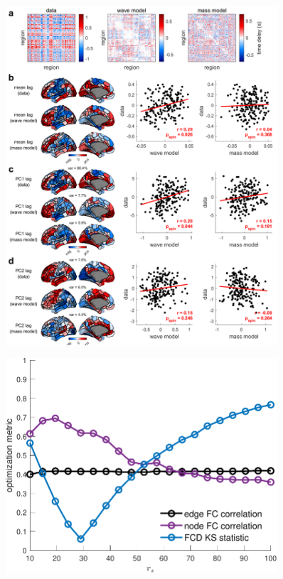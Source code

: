 \documentclass[sn-mathphys-num]{sn-jnl}%
\theoremstyle{thmstyleone}%
\theoremstyle{thmstyletwo}%
\theoremstyle{thmstylethree}%
\begin{document}
\begin{figure}[!htb] 
	\centering
	\includegraphics[width=0.9\textwidth]{fig/extended_fig_9.pdf}
	\caption{}
	\label{fig:extended_fig_9}
\end{figure}


\begin{figure}[!htb] 
	\centering
	\includegraphics[width=0.9\textwidth]{fig/extended_fig_10.pdf}
	\caption{}
	\label{fig:extended_fig_10}
\end{figure}
\end{document}
